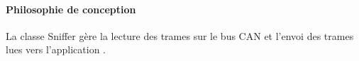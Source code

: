  \paragraph{Philosophie de conception}
La classe Sniffer gère la lecture des trames sur le bus CAN et l'envoi des trames lues vers l'application {\nomApplication}.\\
